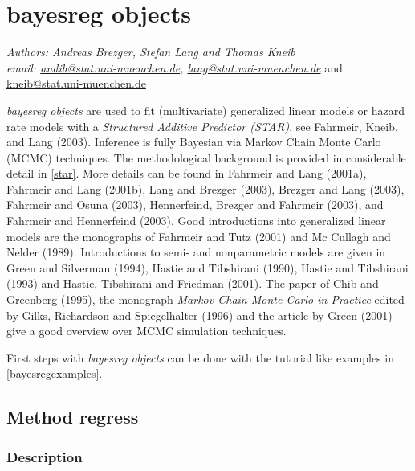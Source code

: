 \chapter{bayesreg objects}
\label{bayesreg} 

{\em Authors: Andreas Brezger, Stefan Lang and Thomas Kneib} \\
{\em email:
\href{mailto:andib@stat.uni-muenchen.de}{andib@stat.uni-muenchen.de},
\href{mailto:lang@stat.uni-muenchen.de}{lang@stat.uni-muenchen.de}}
and
\href{mailto:kneib@stat.uni-muenchen.de}{kneib@stat.uni-muenchen.de} \\
\vspace{0.3cm}


{\em bayesreg objects} are used to fit (multivariate) generalized
linear models or hazard rate models with a {\em Structured
Additive Predictor (STAR)}, see Fahrmeir, Kneib, and Lang (2003).
Inference is fully Bayesian via Markov Chain Monte Carlo (MCMC)
techniques. The methodological background is provided in
considerable detail in \autoref{star}. More details can be found
in Fahrmeir and Lang (2001a), Fahrmeir and Lang (2001b), Lang and
Brezger (2003), Brezger and Lang (2003), Fahrmeir and Osuna
(2003), Hennerfeind, Brezger and Fahrmeir (2003), and Fahrmeir and
Hennerfeind (2003). Good introductions into generalized linear
models are the monographs of Fahrmeir and Tutz (2001) and Mc
Cullagh and Nelder (1989). Introductions to semi- and
nonparametric models are given in Green and Silverman (1994),
Hastie and Tibshirani (1990), Hastie and Tibshirani (1993) and
Hastie, Tibshirani and Friedman (2001). The paper of Chib and
Greenberg (1995), the monograph {\em Markov Chain Monte Carlo in
Practice} edited by Gilks, Richardson and Spiegelhalter (1996) and
the article by Green (2001) give a good overview over MCMC
simulation techniques.

First steps with {\em bayesreg objects} can be done with the
tutorial like examples in \autoref{bayesregexamples}.


\section{Method regress}
\label{bayesregress} 


\subsection{Description}
\label{bayesregregressdescr}

